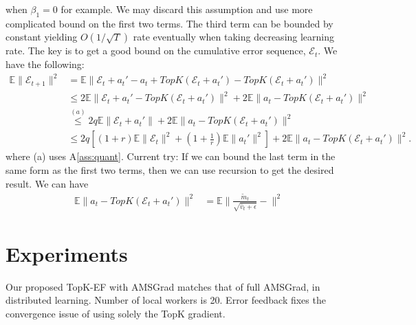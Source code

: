\documentclass[11pt]{article}
\begin{document}
when $\beta_1=0$ for example. We may discard this assumption and use more complicated bound on the first two terms. The third term can be bounded by constant yielding $O(1/\sqrt T)$ rate eventually when taking decreasing learning rate. The key is to get a good bound on the cumulative error sequence, $\mathcal E_t$. We have the following:
\begin{align*}
    \mathbb E\|\mathcal E_{t+1}\|^2&=\mathbb E\|\mathcal E_t+a_t'-a_t+TopK(\mathcal E_t+a_t')-TopK(\mathcal E_t+a_t')\|^2\\
    &\leq 2\mathbb E\|\mathcal E_t+a_t'-TopK(\mathcal E_t+a_t')\|^2+2\mathbb E\|a_t-TopK(\mathcal E_t+a_t')\|^2\\
    & \overset{(a)}{\leq} 2q\mathbb E\|\mathcal E_t+a_t'\|+2\mathbb E\|a_t-TopK(\mathcal E_t+a_t')\|^2\\
    &\leq 2q[(1+r)\mathbb E\|\mathcal E_t\|^2+(1+\frac{1}{r})\mathbb E\|a_t'\|^2]+2\mathbb E\|a_t-TopK(\mathcal E_t+a_t')\|^2.
\end{align*}
where (a) uses A\ref{ass:quant}.
Current try: If we can bound the last term in the same form as the first two terms, then we can use recursion to get the desired result. We can have
\begin{align*}
    \mathbb E\|a_t-TopK(\mathcal E_t+a_t')\|^2&=\mathbb E\| \frac{\tilde m_t}{\sqrt{\hat v_t+\epsilon}}- \|^2
\end{align*}

\newpage
\section{Experiments}\label{sec:experiment}
Our proposed TopK-EF with AMSGrad matches that of full AMSGrad, in distributed learning. Number of local workers is 20. Error feedback fixes the convergence issue of using solely the TopK gradient. 
\end{document}
